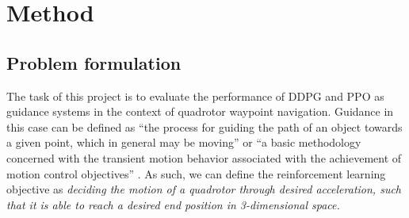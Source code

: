 \chapter{Method}
\label{chap:method}

\section{Problem formulation}

The task of this project is to evaluate the performance of DDPG and PPO as guidance systems in the context of quadrotor waypoint navigation.
Guidance in this case can be defined as “the process for guiding the path of an object towards a given point, which in general may be moving” \cite{shneydor1998Guidance} or ``a basic methodology concerned with the transient motion behavior associated with the achievement of motion control objectives'' \cite{Fossen2021}. As such, we can define the reinforcement learning objective as \textit{deciding the motion of a quadrotor through desired acceleration, such that it is able to reach a desired end position in 3-dimensional space.}

